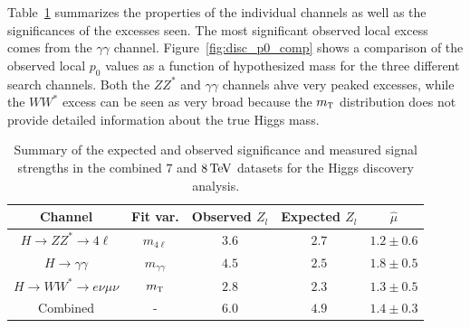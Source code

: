 Table~\ref{tab:discovery_summary} summarizes the properties of the individual channels as well as the significances of the excesses seen. The most significant observed local excess comes from the $\gamma\gamma$ channel. Figure~\ref{fig:disc_p0_comp} shows a comparison of the observed local $p_0$ values as a function of hypothesized mass for the three different search channels. Both the $ZZ^*$ and $\gamma\gamma$ channels ahve very peaked excesses, while the $WW^*$ excess can be seen as very broad because the $m_{\textrm{\footnotesize\sc t}}$ distribution does not provide detailed information about the true Higgs mass. 

\begin{table}[h!]
\centering
\captionsetup{justification=centering}

\hspace{-10pt}
\begin{tabular}{|c|c|c|c|c|}
\hline
Channel & Fit var. & Observed $Z_l$ & Expected $Z_l$ & $\hat{\mu}$ \\ \hline
$H\to ZZ^* \to 4\ell$ & $m_{4\ell}$ & $3.6$ & $2.7$ & $1.2 \pm 0.6$ \\ \hline
$H\to\gamma\gamma$ & $m_{\gamma\gamma}$ & $4.5$ & $2.5$ & $1.8 \pm 0.5$ \\ \hline
$H\to WW^* \to e\nu\mu\nu$ & $m_{\textrm{\footnotesize\sc t}}$ & $2.8$ & $2.3$ & $1.3 \pm 0.5$ \\ \hline
Combined & - & $6.0$ & $4.9$ & $1.4 \pm 0.3$ \\ \hline
\end{tabular}

\caption{
Summary of the expected and observed significance and measured signal strengths in the combined $7$ and $8 \TeV$ datasets for the Higgs discovery analysis\cite{Discovery}. 
}
\label{tab:discovery_summary}
\end{table}

